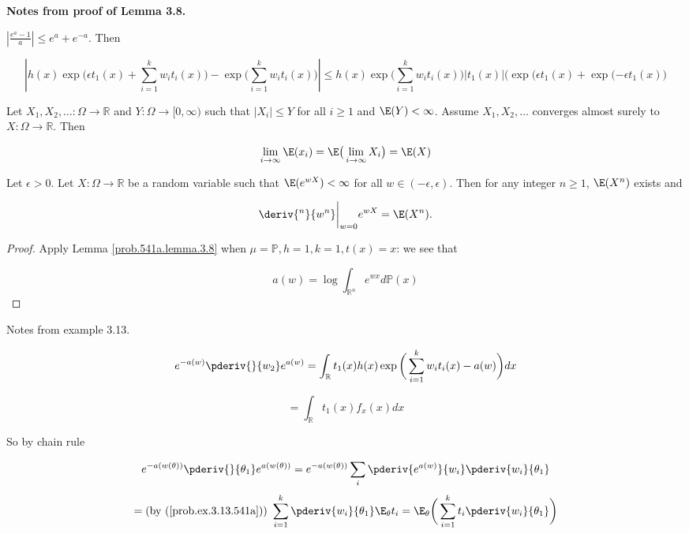 \begin{remark}\textbf{Notes from proof of Lemma 3.8.} 



 \( \left| \frac{e^a - 1}{a} \right| \leq e^a + e^{-a}\). Then

\[
\left|   h(x) \exp\bigg( \epsilon t_1(x) + \sum_{i=1}^k w_i t_i(x) \bigg) - \exp \bigg( \sum_{i=1}^k w_i t_i(x) \bigg)  \right| \leq h(x) \exp \bigg( \sum_{i=1}^k w_i t_i(x) \bigg) |t_1(x) | \bigg( \exp(\epsilon t_1(x) + \exp(- \epsilon t_1(x) \bigg) 
\]



\end{remark}

\begin{theorem}\label{prob.dom.convg.thm} Let \(X_1, X_2, \ldots: \Omega \to \mathbb{R}\) and \(Y: \Omega \to [0, \infty)\) such that \(|X_i| \leq Y\) for all \(i \geq 1\) and \(\E(Y) < \infty\). Assume \(X_1, X_2, \ldots\) converges almost surely to \(X: \Omega \to \mathbb{R}\). Then 

\[
\lim_{i\to \infty} \E(x_i) = \E \big( \lim_{i \to \infty} X_i \big)= \E(X)
\]

\end{theorem}

\begin{corollary} Let \(\epsilon > 0\). Let \(X: \Omega \to \mathbb{R}\) be a random variable such that \(\E(e^{wX})  < \infty\) for all \(w \in (-\epsilon, \epsilon)\). Then for any integer \(n \geq 1\), \(\E(X^n)\) exists and

\[
\deriv{^n}{w^n} \bigg|_{w=0} e^{wX} = \E(X^n).
\]

\end{corollary}

\begin{proof} Apply Lemma \ref{prob.541a.lemma.3.8} when \(\mu = \mathbb{P}, h=1, k=1, t(x)=x\): we see that

\[
a(w) = \log \int_{\mathbb{R}^n}  e^{w x} d\mathbb{P}(x)
\]

\end{proof}

\begin{remark} Notes from example 3.13.

\[
e^{-a(w)} \pderiv{}{w_2} e^{a(w)} = \int_{\mathbb{R}} t_1(x) h(x) \exp \bigg( \sum_{i=1}^k w_i t_i(x) -a(w) \bigg) dx 
\]

\begin{equation}\label{prob.ex.3.13.541a}
= \int_{\mathbb{R}} t_1(x) f_x(x) dx 
\end{equation}

So by chain rule

\begin{equation}\label{prob.ex.3.13b.541a}
e^{-a(w(\theta))} \pderiv{}{\theta_1} e^{a(w(\theta))} = e^{-a(w(\theta))} \sum_i \pderiv{e^{a(w)}}{w_i} \pderiv{w_i}{\theta_1}
\end{equation}
\[
 = \text{(by (\ref{prob.ex.3.13.541a})) } \sum_{i=1}^k \pderiv{w_i}{\theta_1} \E_{\theta} t_i = \E_{\theta} \bigg( \sum_{i=1}^k t_i \pderiv{w_i}{\theta_1} \bigg)
\]

\end{remark}

